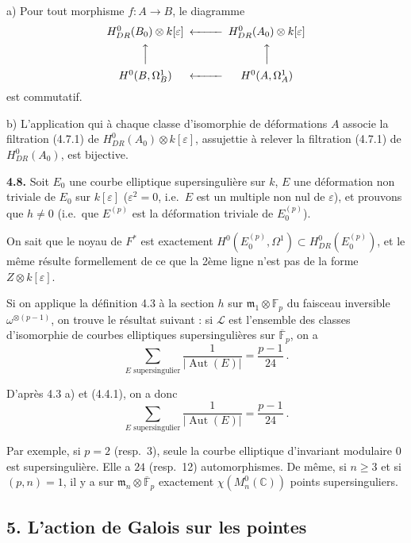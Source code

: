 \documentclass[10pt,a4paper]{amsart}
\theoremstyle{plain}
\theoremstyle{definition}
\DeclareMathOperator{\Aut}{Aut}
\newcommand{\m}{\mathfrak{m}}
\newcommand{\FF}{\mathbb{F}}
\newcommand{\CC}{\mathbb{C}}
\newcommand{\cL}{\mathcal{L}}
\begin{document}
a) Pour tout morphisme $f : A \to B$, le diagramme
\[
\begin{CD}
H^0_{DR}(B_0) \otimes k[\varepsilon] @<<< H^0_{DR}(A_0) \otimes k[\varepsilon] \\
@AAA @AAA \\
H^0(B, \Omega^1_B) @<<< H^0(A, \Omega^1_A)
\end{CD}
\]
est commutatif.

b) L'application qui \`a chaque classe d'isomorphie de d\'eformations $A$ associe la filtration (4.7.1) de $H^0_{DR}(A_0) \otimes k[\varepsilon]$, assujettie \`a relever la filtration (4.7.1) de $H^0_{DR}(A_0)$, est bijective.

\medskip\noindent\textbf{4.8.} Soit $E_0$ une courbe elliptique supersinguli\`ere sur $k$, $E$ une d\'eformation non triviale de $E_0$ sur $k[\varepsilon]$ ($\varepsilon^2 = 0$, i.e.\ $E$ est un multiple non nul de $\varepsilon$), et prouvons que $h \not= 0$ (i.e.\ que $E^{(p)}$ est la d\'eformation triviale de $E_0^{(p)}$).

On sait que le noyau de $F^*$ est exactement $H^0(E_0^{(p)}, \Omega^1) \subset H^0_{DR}(E_0^{(p)})$, et le m\^eme r\'esulte formellement de ce que la 2\`eme ligne n'est pas de la forme $Z \otimes k[\varepsilon]$.

Si on applique la d\'efinition 4.3 \`a la section $h$ sur $\m_1 \otimes \FF_p$ du faisceau inversible $\omega^{\otimes(p-1)}$, on trouve le r\'esultat suivant : si $\cL$ est l'ensemble des classes d'isomorphie de courbes elliptiques supersinguli\`eres sur $\overline{\FF}_p$, on a
\begin{equation}
\sum_{E \text{ supersingulier}} \frac{1}{|\Aut(E)|} = \frac{p-1}{24}\ .
\end{equation}

D'apr\`es 4.3 a) et (4.4.1), on a donc
\begin{equation}
\sum_{E \text{ supersingulier}} \frac{1}{|\Aut(E)|} = \frac{p-1}{24}\ .
\end{equation}

Par exemple, si $p = 2$ (resp.\ 3), seule la courbe elliptique d'invariant modulaire $0$ est supersinguli\`ere. Elle a $24$ (resp.\ 12) automorphismes. De m\^eme, si $n \geq 3$ et si $(p,n) = 1$, il y a sur $\m_n \otimes \overline{\FF}_p$ exactement $\chi(M_n^0(\CC))$ points supersinguliers.


\subsection*{5. L'action de Galois sur les pointes}
\end{document}
